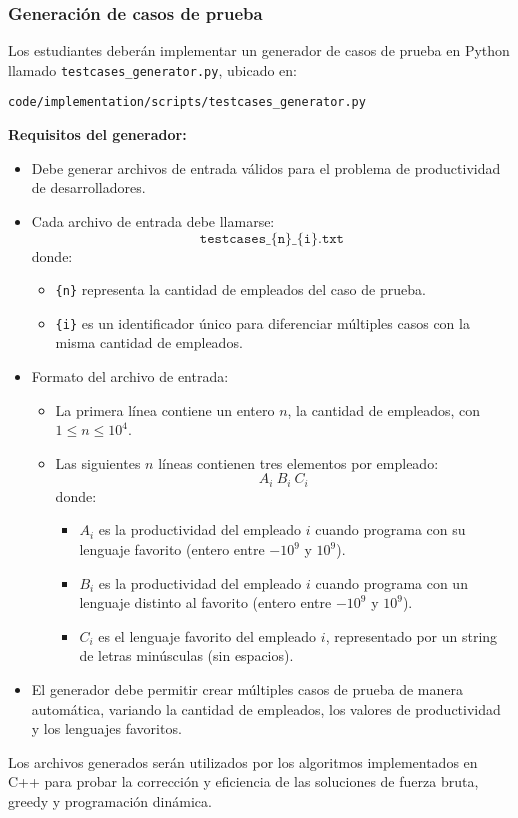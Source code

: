 \subsubsection{Generación de casos de prueba}

Los estudiantes deberán implementar un generador de casos de prueba en Python llamado \texttt{testcases\_generator.py}, ubicado en:

\begin{center}
    \texttt{code/implementation/scripts/testcases\_generator.py}
\end{center}

\textbf{Requisitos del generador:}
\begin{itemize}
    \item Debe generar archivos de entrada válidos para el problema de productividad de desarrolladores.
    \item Cada archivo de entrada debe llamarse:
    \[
        \texttt{testcases\_\{n\}\_\{i\}.txt}
    \]
    donde:
    \begin{itemize}
        \item \texttt{\{n\}} representa la cantidad de empleados del caso de prueba.
        \item \texttt{\{i\}} es un identificador único para diferenciar múltiples casos con la misma cantidad de empleados.
    \end{itemize}
    \item Formato del archivo de entrada:
    \begin{itemize}
        \item La primera línea contiene un entero $n$, la cantidad de empleados, con $1 \le n \le 10^4$.
        \item Las siguientes $n$ líneas contienen tres elementos por empleado:
        \[
        A_i \ B_i \ C_i
        \]
        donde:
        \begin{itemize}
            \item $A_i$ es la productividad del empleado $i$ cuando programa con su lenguaje favorito (entero entre $-10^9$ y $10^9$).
            \item $B_i$ es la productividad del empleado $i$ cuando programa con un lenguaje distinto al favorito (entero entre $-10^9$ y $10^9$).
            \item $C_i$ es el lenguaje favorito del empleado $i$, representado por un string de letras minúsculas (sin espacios).
        \end{itemize}
    \end{itemize}
    \item El generador debe permitir crear múltiples casos de prueba de manera automática, variando la cantidad de empleados, los valores de productividad y los lenguajes favoritos.
\end{itemize}

\begin{mdframed}
    Los archivos generados serán utilizados por los algoritmos implementados en C++ para probar la corrección y eficiencia de las soluciones de fuerza bruta, greedy y programación dinámica.
\end{mdframed}

